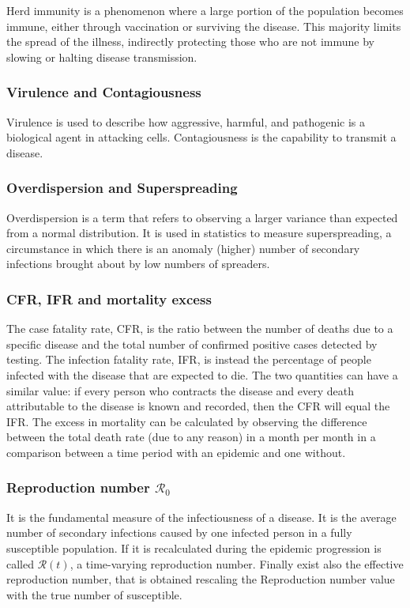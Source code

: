 Herd immunity is a phenomenon where a large portion of the population becomes immune, either through vaccination or surviving the disease. This majority limits the spread of the illness, indirectly protecting those who are not immune by slowing or halting disease transmission.

\subsubsection{Virulence and Contagiousness}  Virulence is used to describe how aggressive, harmful, and pathogenic is a biological agent in attacking cells. Contagiousness is the capability to transmit a disease. 

\subsubsection{Overdispersion and Superspreading} Overdispersion is a term that refers to observing a larger variance than expected from a normal distribution. It is used in statistics to measure superspreading, a circumstance in which there is an anomaly (higher) number of secondary infections brought about by low numbers of spreaders.

\subsubsection{CFR, IFR and mortality excess} The case fatality rate, CFR, is the ratio between the number of deaths due to a specific disease and the total number of confirmed positive cases detected by testing. 
The infection fatality rate, IFR, is instead the percentage of people infected with the disease that are expected to die. The two quantities can have a similar value: if every person who contracts the disease and every death attributable to the disease is known and recorded, then the CFR will equal the IFR.
The excess in mortality can be calculated by observing the difference between the total death rate (due to any reason) in a month per month in a comparison between a time period with an epidemic and one without. 

\subsubsection{Reproduction number $\mathcal{R}_0$} It is the fundamental measure of the infectiousness of a disease. It is the average number of secondary infections caused by one infected person in a fully susceptible population. If it is recalculated during the epidemic progression is called $\mathcal{R}(t)$, a time-varying reproduction number. Finally exist also the effective reproduction number, that is obtained
rescaling the Reproduction number value with the true number of susceptible.

